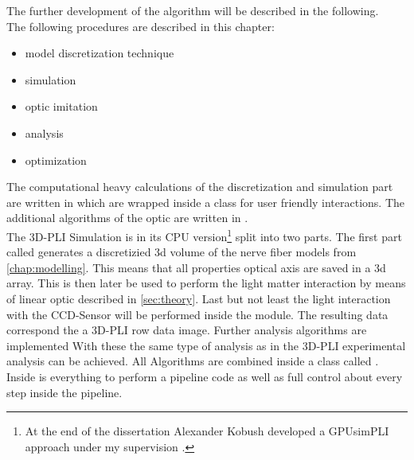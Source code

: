%
The further development of the algorithm will be described in the following.
\\[\baselineskip]
% 
The following procedures are described in this chapter:
\begin{itemize}[nosep]
    \item model discretization technique
    \item simulation
    \item optic imitation 
    \item analysis
    \item optimization
\end{itemize}
% 
The computational heavy calculations of the discretization and simulation part are written in \cpp{} which are wrapped inside a \python class  for user friendly interactions.
The additional algorithms of the optic are written in .
% 
\\[\baselineskip]
% 
The \ac{3D-PLI} Simulation is in its \ac{CPU} version\footnote{At the end of the dissertation Alexander Kobush developed a GPUsimPLI approach under my supervision \cite{}.} split into two parts.
The first part called   generates a discretizied 3d volume of the nerve fiber models from \cref{chap:modelling}.
This means that all properties \eg{} optical axis are saved in a 3d array.
This  is then later be used to perform the light matter interaction by means of linear optic described in \cref{sec:theory}.
Last but not least the light interaction with the \ac{CCD}-Sensor will be performed inside the  module.
The resulting data correspond the a \ac{3D-PLI} row data image.
Further analysis algorithms are implemented
With these the same type of analysis as in the \ac{3D-PLI} experimental analysis can be achieved.
All Algorithms are combined inside a \python{} class called .
Inside is everything to perform a pipeline code as well as full control about every step inside the pipeline.
% 
